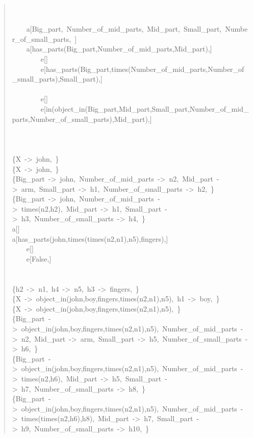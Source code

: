 \begin{quote}
~\\
~\\
~~~~a[Big\_part,~Number\_of\_mid\_parts,~Mid\_part,~Small\_part,~Number\_of\_small\_parts,~]\\
~~~~a[has\_parts(Big\_part,Number\_of\_mid\_parts,Mid\_part),]\\
~~~~~~~~e[]\\
~~~~~~~~e[has\_parts(Big\_part,times(Number\_of\_mid\_parts,Number\_of\_small\_parts),Small\_part),]\\
~\\
~~~~~~~~e[]\\
~~~~~~~~e[in(object\_in(Big\_part,Mid\_part,Small\_part,Number\_of\_mid\_parts,Number\_of\_small\_parts),Mid\_part),]\\
~\\
~\\
~\\
\{X~->~john,~\}\\
\{X~->~john,~\}\\
\{Big\_part~->~john,~Number\_of\_mid\_parts~->~n2,~Mid\_part~->~arm,~Small\_part~->~h1,~Number\_of\_small\_parts~->~h2,~\}\\
\{Big\_part~->~john,~Number\_of\_mid\_parts~->~times(n2,h2),~Mid\_part~->~h1,~Small\_part~->~h3,~Number\_of\_small\_parts~->~h4,~\}\\
a[]\\
a[has\_parts(john,times(times(n2,n1),n5),fingers),]\\
~~~~e[]\\
~~~~e[False,]\\
~\\
~\\
\{h2~->~n1,~h4~->~n5,~h3~->~fingers,~\}\\
\{X~->~object\_in(john,boy,fingers,times(n2,n1),n5),~h1~->~boy,~\}\\
\{X~->~object\_in(john,boy,fingers,times(n2,n1),n5),~\}\\
\{Big\_part~->~object\_in(john,boy,fingers,times(n2,n1),n5),~Number\_of\_mid\_parts~->~n2,~Mid\_part~->~arm,~Small\_part~->~h5,~Number\_of\_small\_parts~->~h6,~\}\\
\{Big\_part~->~object\_in(john,boy,fingers,times(n2,n1),n5),~Number\_of\_mid\_parts~->~times(n2,h6),~Mid\_part~->~h5,~Small\_part~->~h7,~Number\_of\_small\_parts~->~h8,~\}\\
\{Big\_part~->~object\_in(john,boy,fingers,times(n2,n1),n5),~Number\_of\_mid\_parts~->~times(times(n2,h6),h8),~Mid\_part~->~h7,~Small\_part~->~h9,~Number\_of\_small\_parts~->~h10,~\}\\

\end{quote}
